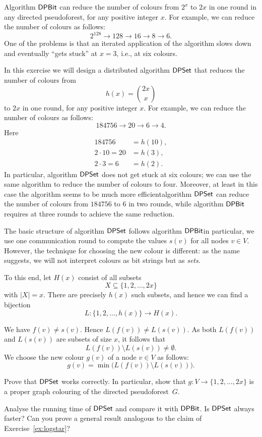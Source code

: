 \begin{ex}\label{ex:dpset}
    Algorithm $\textsf{DPBit}$ can reduce the number of colours from $2^x$ to $2x$ in one round in any directed pseudoforest, for any positive integer $x$. For example, we can reduce the number of colours as follows:
    \[
        2^{128} \to 128 \to 16 \to 8 \to 6.
    \]
    One of the problems is that an iterated application of the algorithm slows down and eventually ``gets stuck'' at $x = 3$, i.e., at six colours.
    
    In this exercise we will design a distributed algorithm $\textsf{DPSet}$ that reduces the number of colours from
    \[
        h(x) = \binom{2x}{x}
    \]
    to $2x$ in one round, for any positive integer $x$. For example, we can reduce the number of colours as follows:
    \[
        184756 \to 20 \to 6 \to 4.
    \]
    Here
    \begin{align*}
        184756 &= h(10), \\
        2 \cdot 10 = 20 &= h(3), \\
        2 \cdot 3 = 6 &= h(2).
    \end{align*}
    In particular, algorithm $\textsf{DPSet}$ does not get stuck at six colours; we can use the same algorithm to reduce the number of colours to four. Moreover, at least in this case the algorithm seems to be much more efficient\mydash algorithm $\textsf{DPSet}$ can reduce the number of colours from $184756$ to $6$ in two rounds, while algorithm $\textsf{DPBit}$ requires at three rounds to achieve the same reduction.
    
    The basic structure of algorithm $\textsf{DPSet}$ follows algorithm $\textsf{DPBit}$\mydash in particular, we use one communication round to compute the values $s(v)$ for all nodes $v \in V$. However, the technique for choosing the new colour is different: as the name suggests, we will not interpret colours as bit strings but as \emph{sets}.
    
    To this end, let $H(x)$ consist of all subsets
    \[
        X \subseteq \{1,2,\dotsc,2x\}
    \]
    with $|X| = x$. There are precisely $h(x)$ such subsets, and hence we can find a bijection
    \[
        L\colon \{1,2,\dotsc,h(x)\} \to H(x).
    \]
    
    We have $f(v) \ne s(v)$. Hence $L(f(v)) \ne L(s(v))$. As both $L(f(v))$ and $L(s(v))$ are subsets of size $x$, it follows that
    \[
        L(f(v)) \setminus L(s(v)) \ne \emptyset.
    \]
    We choose the new colour $g(v)$ of a node $v \in V$ as follows:
    \[
        g(v) = \min \bigl( L(f(v)) \setminus L(s(v)) \bigr).
    \]

    Prove that $\textsf{DPSet}$ works correctly. In particular, show that $g\colon V \to \{1,2,\dotsc,2x\}$ is a proper graph colouring of the directed pseudoforest~$G$.
    
    Analyse the running time of $\textsf{DPSet}$ and compare it with $\textsf{DPBit}$. Is $\textsf{DPSet}$ always faster? Can you prove a general result analogous to the claim of Exercise~\ref{ex:logstar}?
\end{ex}

